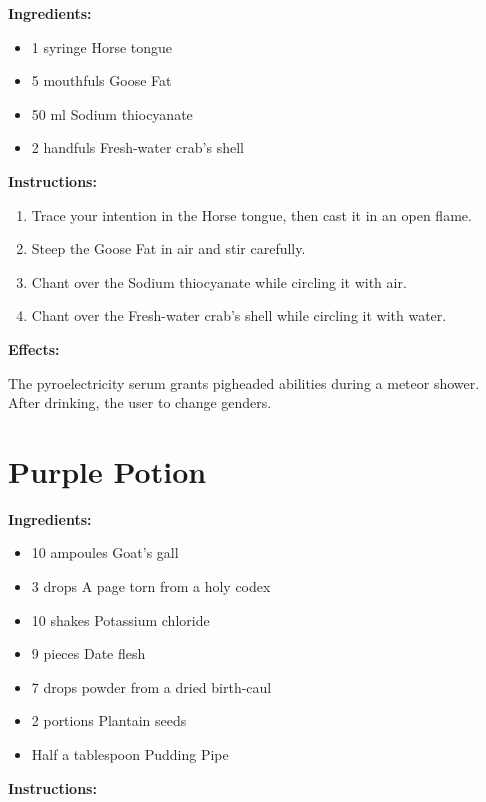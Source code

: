 \documentclass{article}
\begin{document}
\textbf{Ingredients:}

\begin{itemize}
  \item 1 syringe Horse tongue
  \item 5 mouthfuls Goose Fat
  \item 50 ml Sodium thiocyanate
  \item 2 handfuls Fresh-water crab's shell
\end{itemize}

\textbf{Instructions:}

\begin{enumerate}
  \item Trace your intention in the Horse tongue, then cast it in an open flame.
  \item Steep the Goose Fat in air and stir carefully.
  \item Chant over the Sodium thiocyanate while circling it with air.
  \item Chant over the Fresh-water crab's shell while circling it with water.
\end{enumerate}

\textbf{Effects:}

The pyroelectricity serum grants pigheaded abilities during a meteor shower. After drinking, the user to change genders.

\newpage
\section*{Purple Potion}

\textbf{Ingredients:}

\begin{itemize}
  \item 10 ampoules Goat's gall
  \item 3 drops A page torn from a holy codex
  \item 10 shakes Potassium chloride
  \item 9 pieces Date flesh
  \item 7 drops powder from a dried birth-caul
  \item 2 portions Plantain seeds
  \item Half a tablespoon Pudding Pipe
\end{itemize}

\textbf{Instructions:}
\end{document}
